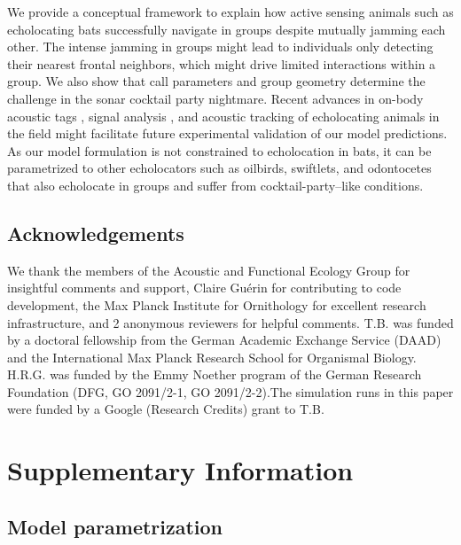 \documentclass[
]{book}
\begin{document}
We provide a conceptual framework to explain how active sensing animals such as echolocating bats successfully navigate in groups despite mutually jamming each other. The intense jamming in groups might lead to individuals only detecting their nearest frontal neighbors, which might drive limited interactions within a group. We also show that call parameters and group geometry determine the challenge in the sonar cocktail party nightmare. Recent advances in on-body acoustic tags \citep{cvikel2015b, stidsholt2018a}, signal analysis \citep{aodha2018a}, and acoustic tracking \citep{seibert2015a} of echolocating animals in the field might facilitate future experimental validation of our model predictions. As our model formulation is not constrained to echolocation in bats, it can be parametrized to other echolocators such as oilbirds, swiftlets, and odontocetes \citep{brinkl2013a, surlykke2014a} that also echolocate in groups and suffer from cocktail-party--like conditions.

\hypertarget{acknowledgements}{%
\subsection{Acknowledgements}\label{acknowledgements}}

We thank the members of the Acoustic and Functional Ecology Group for insightful comments and support, Claire Guérin for contributing to code development, the Max Planck Institute for Ornithology for excellent research infrastructure, and 2 anonymous reviewers for helpful comments. T.B. was funded by a doctoral fellowship from the German Academic Exchange Service (DAAD) and the International Max Planck Research School for Organismal Biology. H.R.G. was funded by the Emmy Noether program of the German Research Foundation (DFG, GO 2091/2-1, GO 2091/2-2).The simulation runs in this paper were funded by a Google (Research Credits) grant to T.B.

\newpage

\hypertarget{supplementary-information}{%
\section{Supplementary Information}\label{supplementary-information}}

\hypertarget{model-parametrization-1}{%
\subsection{Model parametrization}\label{model-parametrization-1}}
\end{document}
